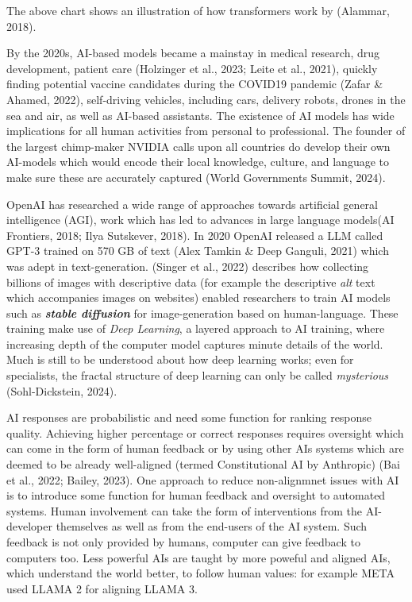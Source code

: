 \documentclass[
  letterpaper,
  DIV=11,
  numbers=noendperiod]{scrartcl}
\begin{document}
The above chart shows an illustration of how transformers work by
(Alammar, 2018).

By the 2020s, AI-based models became a mainstay in medical research,
drug development, patient care (Holzinger et al., 2023; Leite et al.,
2021), quickly finding potential vaccine candidates during the COVID19
pandemic (Zafar \& Ahamed, 2022), self-driving vehicles, including cars,
delivery robots, drones in the sea and air, as well as AI-based
assistants. The existence of AI models has wide implications for all
human activities from personal to professional. The founder of the
largest chimp-maker NVIDIA calls upon all countries do develop their own
AI-models which would encode their local knowledge, culture, and
language to make sure these are accurately captured (World Governments
Summit, 2024).

OpenAI has researched a wide range of approaches towards artificial
general intelligence (AGI), work which has led to advances in large
language models(AI Frontiers, 2018; Ilya Sutskever, 2018). In 2020
OpenAI released a LLM called GPT-3 trained on 570 GB of text (Alex
Tamkin \& Deep Ganguli, 2021) which was adept in text-generation.
(Singer et al., 2022) describes how collecting billions of images with
descriptive data (for example the descriptive \emph{alt} text which
accompanies images on websites) enabled researchers to train AI models
such as \textbf{\emph{stable diffusion}} for image-generation based on
human-language. These training make use of \emph{Deep Learning}, a
layered approach to AI training, where increasing depth of the computer
model captures minute details of the world. Much is still to be
understood about how deep learning works; even for specialists, the
fractal structure of deep learning can only be called \emph{mysterious}
(Sohl-Dickstein, 2024).

AI responses are probabilistic and need some function for ranking
response quality. Achieving higher percentage or correct responses
requires oversight which can come in the form of human feedback or by
using other AIs systems which are deemed to be already well-aligned
(termed Constitutional AI by Anthropic) (Bai et al., 2022; Bailey,
2023). One approach to reduce non-alignmnet issues with AI is to
introduce some function for human feedback and oversight to automated
systems. Human involvement can take the form of interventions from the
AI-developer themselves as well as from the end-users of the AI system.
Such feedback is not only provided by humans, computer can give feedback
to computers too. Less powerful AIs are taught by more poweful and
aligned AIs, which understand the world better, to follow human values:
for example META used LLAMA 2 for aligning LLAMA 3.
\end{document}
